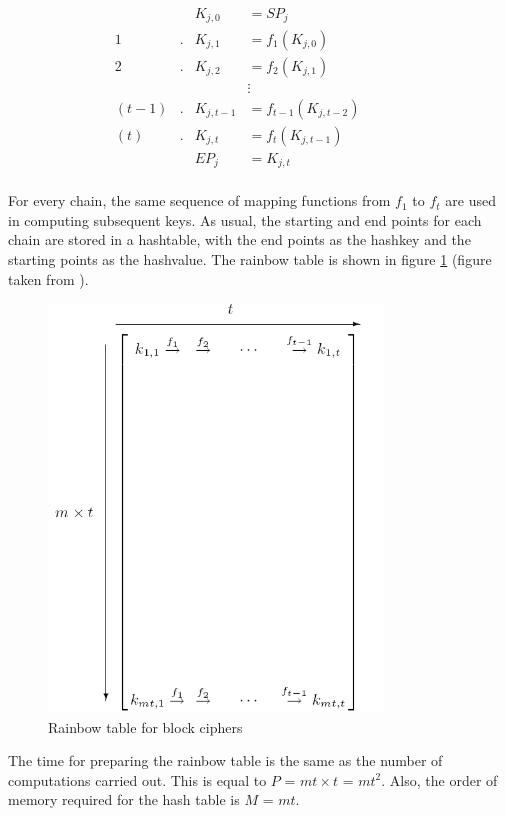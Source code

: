 \begin{align*}
& & K_{j,0} & = SP_j & & & &\\
1&. &K_{j,1} & = f_1(K_{j,0}) & & & &\\
2&. &K_{j,2} & = f_2(K_{j,1}) & & & &\\
& & &\vdots & & & &\\
(t-1)&. &K_{j,t-1} & = f_{t-1}(K_{j,t-2}) & & & &\\
(t)&. &K_{j,t} & = f_t(K_{j,t-1}) & & & &\\
& & EP_j & = K_{j,t} & & & &\\
\end{align*}

For every chain, the same sequence of mapping functions from $f_1$ to $f_t$ are used in computing subsequent keys. As usual, the starting and end points for each chain are stored in a hashtable, with the end points as the hashkey and the starting points as the hashvalue. The rainbow table is shown in figure \ref{fig:rainbow-table} (figure taken from \cite{oechslin:mfc}).

\begin{figure}[ht!]
	\centering
		\includegraphics[width=3.5in]{./figures/rainbow-table.PNG}
	\caption{Rainbow table for block ciphers}	
	\label{fig:rainbow-table}
\end{figure}

The time for preparing the rainbow table is the same as the number of computations carried out. This is equal to $P$ = $mt \times t$ = $mt^2$. Also, the order of memory required for the hash table is $M$ = $mt$. \\

